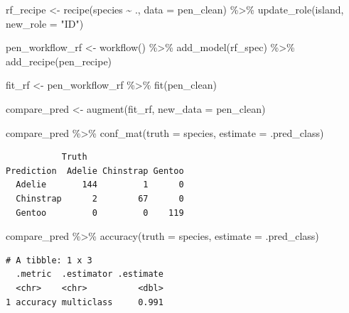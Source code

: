 \documentclass[
  letterpaper,
  DIV=11,
  numbers=noendperiod]{scrreprt}
\newenvironment{Shaded}{\begin{snugshade}}{\end{snugshade}}
\newcommand{\AttributeTok}[1]{\textcolor[rgb]{0.40,0.45,0.13}{#1}}
\newcommand{\FunctionTok}[1]{\textcolor[rgb]{0.28,0.35,0.67}{#1}}
\newcommand{\NormalTok}[1]{\textcolor[rgb]{0.00,0.23,0.31}{#1}}
\newcommand{\OtherTok}[1]{\textcolor[rgb]{0.00,0.23,0.31}{#1}}
\newcommand{\SpecialCharTok}[1]{\textcolor[rgb]{0.37,0.37,0.37}{#1}}
\newcommand{\StringTok}[1]{\textcolor[rgb]{0.13,0.47,0.30}{#1}}
\begin{document}
\begin{Shaded}
\begin{Highlighting}[]
\NormalTok{rf\_recipe }\OtherTok{\textless{}{-}} 
  \FunctionTok{recipe}\NormalTok{(species }\SpecialCharTok{\textasciitilde{}}\NormalTok{ ., }\AttributeTok{data =}\NormalTok{ pen\_clean) }\SpecialCharTok{\%\textgreater{}\%} 
  \FunctionTok{update\_role}\NormalTok{(island,  }\AttributeTok{new\_role =} \StringTok{"ID"}\NormalTok{)}

\NormalTok{pen\_workflow\_rf }\OtherTok{\textless{}{-}} \FunctionTok{workflow}\NormalTok{() }\SpecialCharTok{\%\textgreater{}\%}
  \FunctionTok{add\_model}\NormalTok{(rf\_spec) }\SpecialCharTok{\%\textgreater{}\%}
  \FunctionTok{add\_recipe}\NormalTok{(pen\_recipe)}

\NormalTok{fit\_rf }\OtherTok{\textless{}{-}}\NormalTok{ pen\_workflow\_rf }\SpecialCharTok{\%\textgreater{}\%} \FunctionTok{fit}\NormalTok{(pen\_clean)}
\end{Highlighting}
\end{Shaded}

\begin{Shaded}
\begin{Highlighting}[]
\NormalTok{compare\_pred }\OtherTok{\textless{}{-}} \FunctionTok{augment}\NormalTok{(fit\_rf, }\AttributeTok{new\_data =}\NormalTok{ pen\_clean) }

\NormalTok{compare\_pred }\SpecialCharTok{\%\textgreater{}\%} \FunctionTok{conf\_mat}\NormalTok{(}\AttributeTok{truth =}\NormalTok{ species, }\AttributeTok{estimate =}\NormalTok{ .pred\_class)}
\end{Highlighting}
\end{Shaded}

\begin{verbatim}
           Truth
Prediction  Adelie Chinstrap Gentoo
  Adelie       144         1      0
  Chinstrap      2        67      0
  Gentoo         0         0    119
\end{verbatim}

\begin{Shaded}
\begin{Highlighting}[]
\NormalTok{compare\_pred }\SpecialCharTok{\%\textgreater{}\%}  \FunctionTok{accuracy}\NormalTok{(}\AttributeTok{truth =}\NormalTok{ species, }\AttributeTok{estimate =}\NormalTok{ .pred\_class)}
\end{Highlighting}
\end{Shaded}

\begin{verbatim}
# A tibble: 1 x 3
  .metric  .estimator .estimate
  <chr>    <chr>          <dbl>
1 accuracy multiclass     0.991
\end{verbatim}
\end{document}
